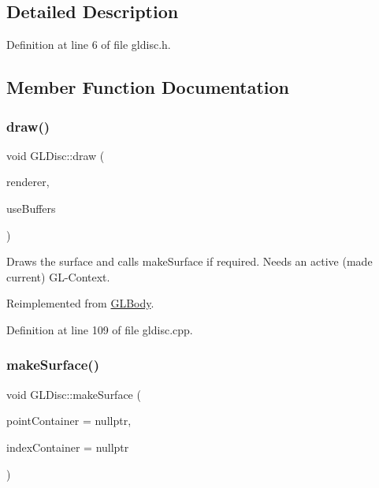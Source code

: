 \subsection{Detailed Description}


Definition at line 6 of file gldisc.\+h.



\subsection{Member Function Documentation}
\mbox{\label{class_g_l_disc_a7fca90525cba1fb6099d70730375cc6e}} 
\subsubsection{\texorpdfstring{draw()}{draw()}}
{\footnotesize\ttfamily void G\+L\+Disc\+::draw (\begin{DoxyParamCaption}\item[{\mbox{\hyperlink{class_g_l_e_s_renderer}{G\+L\+E\+S\+Renderer}} $\ast$}]{renderer,  }\item[{bool}]{use\+Buffers }\end{DoxyParamCaption})\hspace{0.3cm}{\ttfamily [virtual]}}

Draws the surface and calls make\+Surface if required. Needs an active (made current) G\+L-\/\+Context. 

Reimplemented from \mbox{\hyperlink{class_g_l_body_aaeb47c0a8cfc36caed81fc139c42ddfc}{G\+L\+Body}}.



Definition at line 109 of file gldisc.\+cpp.

\mbox{\label{class_g_l_disc_a5b74533be5d65c44f7f5493163b94eb4}} 
\subsubsection{\texorpdfstring{makeSurface()}{makeSurface()}}
{\footnotesize\ttfamily void G\+L\+Disc\+::make\+Surface (\begin{DoxyParamCaption}\item[{Q\+Vector$<$ \mbox{\hyperlink{class_g_l_point}{G\+L\+Point}} $>$ $\ast$}]{point\+Container = {\ttfamily nullptr},  }\item[{Q\+Vector$<$ G\+Lushort $>$ $\ast$}]{index\+Container = {\ttfamily nullptr} }\end{DoxyParamCaption})}


